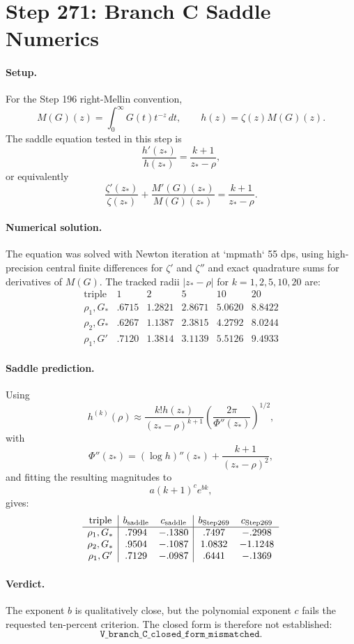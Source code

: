 \section*{Step 271: Branch C Saddle Numerics}

\paragraph{Setup.}
For the Step 196 right-Mellin convention,
\[
  M(G)(z)=\int_0^\infty G(t)t^{-z}\,dt,
  \qquad h(z)=\zeta(z)M(G)(z).
\]
The saddle equation tested in this step is
\[
  \frac{h'(z_*)}{h(z_*)}=\frac{k+1}{z_*-\rho},
\]
or equivalently
\[
  \frac{\zeta'(z_*)}{\zeta(z_*)}+\frac{M'(G)(z_*)}{M(G)(z_*)}
  =\frac{k+1}{z_*-\rho}.
\]

\paragraph{Numerical solution.}
The equation was solved with Newton iteration at `mpmath` 55 dps, using
high-precision central finite differences for $\zeta'$ and $\zeta''$ and exact
quadrature sums for derivatives of $M(G)$.  The tracked radii
$|z_*-\rho|$ for $k=1,2,5,10,20$ are:
\[
\begin{array}{c|ccccc}
\text{triple} & 1&2&5&10&20\\\hline
\rho_1,G_* & .6715&1.2821&2.8671&5.0620&8.8422\\
\rho_2,G_* & .6267&1.1387&2.3815&4.2792&8.0244\\
\rho_1,G' & .7120&1.3814&3.1139&5.5126&9.4933
\end{array}
\]

\paragraph{Saddle prediction.}
Using
\[
  h^{(k)}(\rho)\approx
  \frac{k!h(z_*)}{(z_*-\rho)^{k+1}}
  \left(\frac{2\pi}{\Phi''(z_*)}\right)^{1/2},
\]
with
\[
  \Phi''(z_*)=(\log h)''(z_*)+\frac{k+1}{(z_*-\rho)^2},
\]
and fitting the resulting magnitudes to
\[
  a(k+1)^c e^{bk},
\]
gives:
\[
\begin{array}{c|cc|cc}
\text{triple} & b_{\rm saddle}&c_{\rm saddle}&b_{\rm Step269}&c_{\rm Step269}\\\hline
\rho_1,G_* & .7994&-.1380&.7497&-.2998\\
\rho_2,G_* & .9504&-.1087&1.0832&-1.1248\\
\rho_1,G' & .7129&-.0987&.6441&-.1369
\end{array}
\]

\paragraph{Verdict.}
The exponent $b$ is qualitatively close, but the polynomial exponent $c$ fails
the requested ten-percent criterion.  The closed form is therefore not
established:
\[
  \boxed{\texttt{V\_branch\_C\_closed\_form\_mismatched}}.
\]
